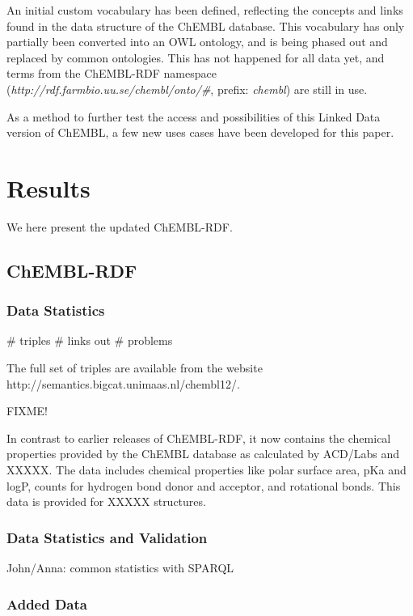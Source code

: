 \documentclass[sw]{iosart2c}
\begin{document}
An initial custom vocabulary has been defined, reflecting the concepts and links found in the
data structure of the ChEMBL database. This vocabulary has only partially been converted into
an OWL ontology, and is being phased out and replaced by common ontologies. This has not happened
for all data yet, and terms from the ChEMBL-RDF namespace (\textit{http://rdf.farmbio.uu.se/chembl/onto/\#},
prefix: \textit{chembl}) are still in use.

As a method to further test the access and possibilities of this Linked Data version of
ChEMBL, a few new uses cases have been developed for this paper.

\section{Results}\label{s3}

We here present the updated ChEMBL-RDF.

\subsection{ChEMBL-RDF}

\subsubsection{Data Statistics}

\# triples
\# links out
\# problems

The full set of triples are available from the website http://semantics.bigcat.unimaas.nl/chembl12/.

FIXME!

In contrast to earlier releases of ChEMBL-RDF, it now contains the chemical properties
provided by the ChEMBL database as calculated by ACD/Labs and XXXXX. The data includes
chemical properties like polar surface area, pKa and logP, counts for hydrogen bond donor
and acceptor, and rotational bonds. This data is provided for XXXXX structures.

\subsubsection{Data Statistics and Validation}

John/Anna: common statistics with SPARQL

\subsubsection{Added Data}
\end{document}
